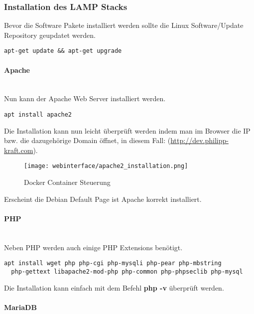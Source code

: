 \subsubsection{Installation des LAMP Stacks}
Bevor die Software Pakete installiert werden sollte die Linux Software/Update
Repository geupdatet werden.

\begin{lstlisting}[caption={Respositorys updaten}, captionpos=b]
  apt-get update && apt-get upgrade
\end{lstlisting}

\paragraph{Apache}\mbox{}\\

Nun kann der Apache Web Server installiert werden.

\begin{lstlisting}[caption={Apache installieren}, captionpos=b]
  apt install apache2
\end{lstlisting}

Die Installation kann nun leicht überprüft werden indem man im Browser die IP
bzw. die dazugehörige Domain öffnet, in diesem Fall:
(\url{http://dev.philipp-kraft.com}).

\begin{figure}[H]
  \centering
  \texttt{[image: webinterface/apache2\_installation.png]}
  \caption{Docker Container Steuerung}
\end{figure}

Erscheint die Debian Default Page ist Apache korrekt installiert.

\paragraph{PHP}\mbox{}\\
Neben PHP werden auch einige PHP Extensions benötigt.
\begin{lstlisting}[caption={PHP installieren}, captionpos=b]
  apt install wget php php-cgi php-mysqli php-pear php-mbstring
  php-gettext libapache2-mod-php php-common php-phpseclib php-mysql
\end{lstlisting}

Die Installation kann einfach mit dem Befehl \textbf{php -v} überprüft werden.

\paragraph{MariaDB}\mbox{}\\

